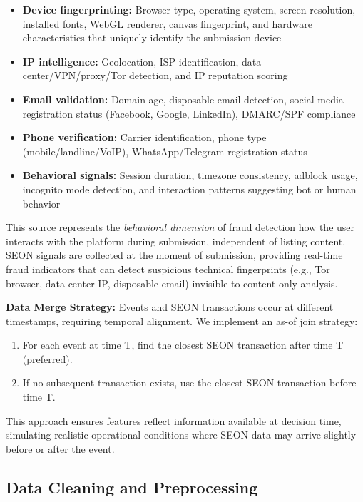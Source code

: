 \begin{itemize}
    \item \textbf{Device fingerprinting:} Browser type, operating system, screen resolution, installed fonts, WebGL renderer, canvas fingerprint, and hardware characteristics that uniquely identify the submission device
    \item \textbf{IP intelligence:} Geolocation, ISP identification, data center/VPN/proxy/Tor detection, and IP reputation scoring
    \item \textbf{Email validation:} Domain age, disposable email detection, social media registration status (Facebook, Google, LinkedIn), DMARC/SPF compliance
    \item \textbf{Phone verification:} Carrier identification, phone type (mobile/landline/VoIP), WhatsApp/Telegram registration status
    \item \textbf{Behavioral signals:} Session duration, timezone consistency, adblock usage, incognito mode detection, and interaction patterns suggesting bot or human behavior
\end{itemize}

This source represents the \emph{behavioral dimension} of fraud detection how the user interacts with the platform during submission, independent of listing content. SEON signals are collected at the moment of submission, providing real-time fraud indicators that can detect suspicious technical fingerprints (e.g., Tor browser, data center IP, disposable email) invisible to content-only analysis.

\textbf{Data Merge Strategy:} Events and SEON transactions occur at different timestamps, requiring temporal alignment. We implement an as-of join strategy:

\begin{enumerate}
    \item For each event at time T, find the closest SEON transaction after time T (preferred).
    \item If no subsequent transaction exists, use the closest SEON transaction before time T.
\end{enumerate}

This approach ensures features reflect information available at decision time, simulating realistic operational conditions where SEON data may arrive slightly before or after the event.

\subsection{Data Cleaning and Preprocessing}

